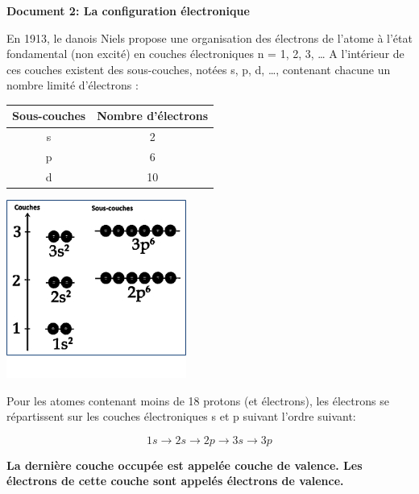 \documentclass[french]{article}
\begin{document}
	\begin{mdframed}[style=doc, leftmargin=0cm, rightmargin=0cm, innertopmargin=8pt, innerbottommargin=8pt, innerrightmargin=10pt, innerleftmargin=10pt]
		\noindent\textbf{Document 2: La configuration électronique}\bigskip

	En 1913, le danois Niels  propose une organisation des électrons de l'atome à l'état fondamental (non excité) en couches électroniques n = 1, 2, 3, … A l'intérieur de ces couches existent des sous-couches, notées s, p, d, …, contenant chacune un nombre limité d'électrons :\medskip


	\begin{minipage}{6cm}
		\begin{tabular}{|c|c|}
			\hline 
			\textbf{Sous-couches} & \textbf{Nombre d'électrons} \\ \hline
			s & 2 \\ \hline
			p & 6 \\ \hline
			d & 10 \\ \hline
		\end{tabular}
	\end{minipage}\hfill
	\begin{minipage}{6cm}
		\includegraphics[width=.8\textwidth]{RemplissageSousCouchesElectroniques.jpg}
		\textbf{}
	\end{minipage}

	Pour les atomes contenant moins de 18 protons (et électrons), les électrons se répartissent sur les couches électroniques s et p suivant l'ordre suivant: 
	
	\[1s\rightarrow 2s \rightarrow 2p \rightarrow 3s \rightarrow 3p\]

	\textbf{La dernière couche occupée est appelée couche de valence. Les électrons de cette couche sont appelés électrons de valence.}
\end{mdframed}
\end{document}
